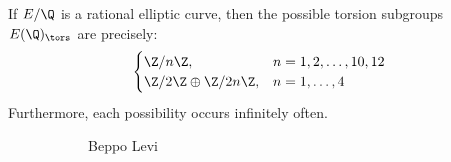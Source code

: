 \begin{frame}[plain]
\begin{thm}
If $E/\Q$ is a rational elliptic curve, then the possible torsion subgroups $E(\Q)_\tors$ are precisely:
	\[
	\begin{cases}
	\Z/n\Z, & n=1,2,\ldots,10,12 \\
	\Z/2\Z \oplus \Z/2n\Z, & n=1,\ldots,4
	\end{cases}
	\]
Furthermore, each possibility occurs infinitely often.
\end{thm}
	\begin{figure}[h]
	\centering
	\begin{subfigure}{0.3\textwidth}
	\captionsetup{labelformat=empty}
	\centering
	\caption{Beppo Levi}
	\end{subfigure}
	\begin{subfigure}{0.3\textwidth}
	\captionsetup{labelformat=empty}
	\centering

\end{subfigure}
\end{figure}
\end{frame}

